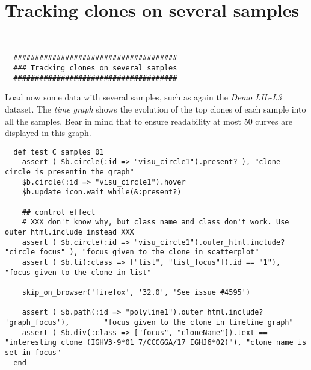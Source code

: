 

\section{Tracking clones on several samples}

\label{sec:tracking}
\begin{verbatim}


  ######################################
  ### Tracking clones on several samples
  ######################################

\end{verbatim}

Load now some data with several samples, such as again the \textit{Demo LIL-L3} dataset.
The \textit{time graph} shows the evolution of the top clones of each sample into all the samples.
Bear in mind that to ensure readability at most 50 curves are displayed in this graph.

\begin{verbatim}
  def test_C_samples_01
    assert ( $b.circle(:id => "visu_circle1").present? ), "clone circle is presentin the graph"
    $b.circle(:id => "visu_circle1").hover
    $b.update_icon.wait_while(&:present?)

    ## control effect
    # XXX don't know why, but class_name and class don't work. Use outer_html.include instead XXX
    assert ( $b.circle(:id => "visu_circle1").outer_html.include? "circle_focus" ), "focus given to the clone in scatterplot"
    assert ( $b.li(:class => ["list", "list_focus"]).id == "1"),                    "focus given to the clone in list"

    skip_on_browser('firefox', '32.0', 'See issue #4595')

    assert ( $b.path(:id => "polyline1").outer_html.include? 'graph_focus'),        "focus given to the clone in timeline graph"
    assert ( $b.div(:class => ["focus", "cloneName"]).text == "interesting clone (IGHV3-9*01 7/CCCGGA/17 IGHJ6*02)"), "clone name is set in focus"
  end
\end{verbatim}

